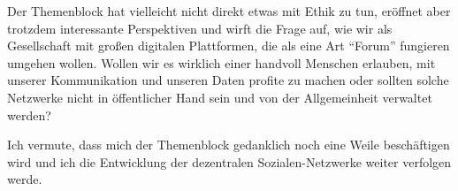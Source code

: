 \documentclass[12pt]{article}
\begin{document}
Der Themenblock hat vielleicht nicht direkt etwas mit Ethik zu tun, eröffnet aber trotzdem interessante Perspektiven und wirft die Frage auf, wie wir als Gesellschaft mit großen digitalen Plattformen, die als eine Art ``Forum'' fungieren umgehen wollen.
Wollen wir es wirklich einer handvoll Menschen erlauben, mit unserer Kommunikation und unseren Daten profite zu machen oder sollten solche Netzwerke nicht in öffentlicher Hand sein und von der Allgemeinheit verwaltet werden?

\vspace{1em}

Ich vermute, dass mich der Themenblock gedanklich noch eine Weile beschäftigen wird und ich die Entwicklung der dezentralen Sozialen-Netzwerke weiter verfolgen werde.
\end{document}
